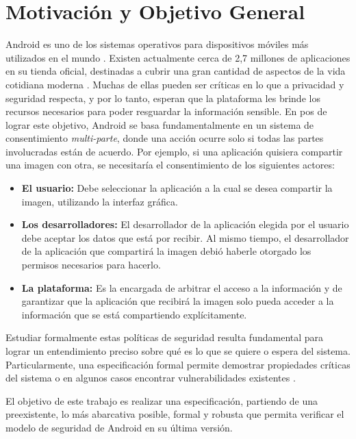 \section{Motivación y Objetivo General}

Android es uno de los sistemas operativos para dispositivos móviles más
utilizados en el mundo \cite{1,2}. Existen actualmente cerca de 2,7 millones de
aplicaciones en su tienda oficial, destinadas a cubrir una gran cantidad de
aspectos de la vida cotidiana moderna \cite{3}. Muchas de ellas pueden ser críticas
en lo que a privacidad y seguridad respecta, y por lo tanto, esperan que la plataforma
les brinde los recursos necesarios para poder resguardar la información sensible.
En pos de lograr este objetivo, Android se basa fundamentalmente en un
sistema de consentimiento \textit{multi-parte}, donde una acción ocurre solo si
todas las partes involucradas están de acuerdo. Por ejemplo, si una aplicación
quisiera compartir una imagen con otra, se necesitaría el consentimiento de los
siguientes actores:

\begin{itemize}
   \item \textbf{El usuario: } Debe seleccionar la aplicación a la cual se desea
   compartir la imagen, utilizando la interfaz gráfica.
   \item \textbf{Los desarrolladores: } El desarrollador de la aplicación
   elegida por el usuario debe aceptar los datos que está por recibir. Al mismo
   tiempo, el desarrollador de la aplicación que compartirá la imagen debió
   haberle otorgado los permisos necesarios para hacerlo.
   \item \textbf{La plataforma: } Es la encargada de arbitrar el acceso a la
   información y de garantizar que la aplicación que recibirá la imagen solo pueda
   acceder a la información que se está compartiendo explícitamente.
\end{itemize}


Estudiar formalmente estas políticas de seguridad resulta fundamental para
lograr un entendimiento preciso sobre qué es lo que se quiere o espera del
sistema. Particularmente, una especificación formal permite demostrar
propiedades críticas del sistema o en algunos casos encontrar vulnerabilidades
existentes \cite{alloy}.

El objetivo de este trabajo es realizar una especificación, partiendo de una
preexistente, lo más abarcativa posible, formal y robusta que permita verificar
el modelo de seguridad de Android en su última versión.

